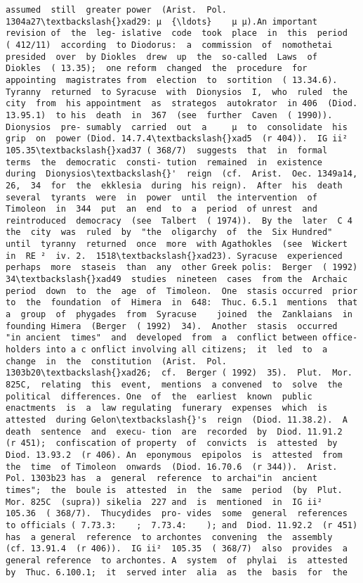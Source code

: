 \documentclass[11pt]{article}
\begin{document}
\begin{Verbatim}[commandchars=\\\{\}]
assumed  still  greater power  (Arist.  Pol. 1304a27\textbackslash{}xad29: µ  {\ldots}    µ µ).An important revision of  the  leg- islative  code  took  place  in  this  period  ( 412/11)  according  to Diodorus:  a  commission  of  nomothetai  presided  over  by Diokles  drew  up  the  so-called  Laws  of  Diokles  ( 13.35);  one reform  changed  the  procedure  for  appointing  magistrates from  election  to  sortition  ( 13.34.6).  Tyranny  returned  to Syracuse  with  Dionysios  I,  who  ruled  the  city  from  his appointment  as  strategos  autokrator  in 406  (Diod. 13.95.1)  to his  death  in  367  (see  further  Caven  ( 1990)).  Dionysios  pre- sumably  carried  out  a     µ  to  consolidate  his grip  on  power (Diod. 14.7.4\textbackslash{}xad5  (r 404)).  IG ii²  105.35\textbackslash{}xad37 ( 368/7)  suggests  that  in  formal  terms  the  democratic  consti- tution  remained  in  existence  during  Dionysios\textbackslash{}'  reign  (cf.  Arist.  Oec. 1349a14,  26,  34  for  the  ekklesia  during  his reign).  After  his  death  several  tyrants  were  in  power  until  the intervention  of  Timoleon  in  344  put  an  end  to  a  period  of unrest  and  reintroduced  democracy  (see  Talbert  ( 1974)).  By the  later  C 4  the  city  was  ruled  by  "the  oligarchy  of  the  Six Hundred"  until  tyranny  returned  once  more  with Agathokles  (see  Wickert  in  RE ²  iv. 2.  1518\textbackslash{}xad23). Syracuse  experienced  perhaps  more  staseis  than  any  other Greek polis:  Berger  ( 1992)  34\textbackslash{}xad49  studies  nineteen  cases  from the  Archaic  period  down  to  the  age  of  Timoleon.  One  stasis occurred  prior  to  the  foundation  of  Himera  in  648:  Thuc. 6.5.1  mentions  that  a  group  of  phygades  from  Syracuse    joined  the  Zanklaians  in  founding Himera  (Berger  ( 1992)  34).  Another  stasis  occurred  "in ancient  times"  and  developed  from  a  conflict between office-holders into a c onflict involving all citizens;  it  led  to  a change  in  the  constitution  (Arist.  Pol. 1303b20\textbackslash{}xad26;  cf.  Berger ( 1992)  35).  Plut.  Mor. 825C,  relating  this  event,  mentions  a convened  to  solve  the  political  differences. One  of  the  earliest  known  public  enactments  is  a  law regulating  funerary  expenses  which  is  attested  during Gelon\textbackslash{}'s  reign  (Diod. 11.38.2).  A  death  sentence  and  execu- tion  are  recorded  by  Diod. 11.91.2  (r 451);  confiscation of property  of  convicts  is  attested  by  Diod. 13.93.2  (r 406). An  eponymous  epipolos  is  attested  from  the  time  of Timoleon  onwards  (Diod. 16.70.6  (r 344)).  Arist.  Pol. 1303b23 has  a  general  reference  to archai"in  ancient  times";  the  boule is  attested  in  the  same  period  (by  Plut.  Mor. 825C  (supra)) sikelia  227 and  is  mentioned  in  IG ii²  105.36  ( 368/7).  Thucydides  pro- vides  some  general  references  to officials ( 7.73.3:    ;  7.73.4:    ); and  Diod. 11.92.2  (r 451)  has  a general  reference  to archontes  convening  the  assembly  (cf. 13.91.4  (r 406)).  IG ii²  105.35  ( 368/7)  also  provides  a  general reference  to archontes. A  system  of  phylai  is  attested  by  Thuc. 6.100.1;  it  served inter  alia  as  the  basis  for  the  
\end{Verbatim}
\end{document}
